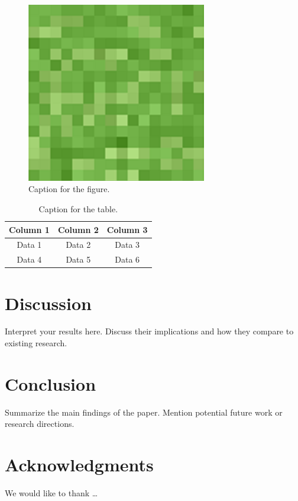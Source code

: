 \documentclass[a4paper,12pt]{article}
\begin{document}
\begin{figure}[h]
    \centering
    \includegraphics[width=0.7\textwidth]{resources/images/grass.png}
    \caption{Caption for the figure.}
    \label{fig:example}
\end{figure}

\begin{table}[h]
    \centering
    \begin{tabular}{|c|c|c|}
    \hline
    Column 1 & Column 2 & Column 3 \\
    \hline
    Data 1 & Data 2 & Data 3 \\
    Data 4 & Data 5 & Data 6 \\
    \hline
    \end{tabular}
    \caption{Caption for the table.}
    \label{table:example}
\end{table}

\section{Discussion}
Interpret your results here. Discuss their implications and how they compare to existing research.

\section{Conclusion}
Summarize the main findings of the paper. Mention potential future work or research directions.

\section*{Acknowledgments}
We would like to thank \dots

\end{document}
